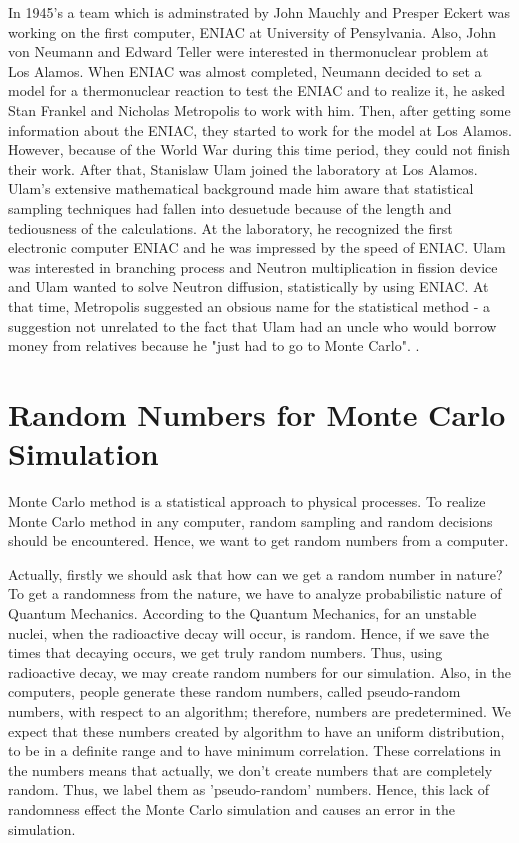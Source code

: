 \documentclass[12pt,fleqn]{report}
\begin{document}
In 1945's a team which is adminstrated by John Mauchly and Presper Eckert was working on the first computer, ENIAC at University of Pensylvania. Also, John von Neumann and Edward Teller were interested in thermonuclear problem at Los Alamos. When ENIAC was almost completed, Neumann decided to set a model for a thermonuclear reaction to test the ENIAC and to realize it, he asked Stan Frankel and Nicholas Metropolis to work with him. Then, after getting some information about the ENIAC, they started to work for the model at Los Alamos. However, because of the World War during this time period, they could not finish their work. After that, Stanislaw Ulam joined the laboratory at Los Alamos. 
Ulam's extensive mathematical background made him aware that statistical sampling techniques had fallen into desuetude because of the length and tediousness of the calculations.\cite{mc}  At the laboratory, he recognized the first electronic computer ENIAC and he was impressed by the speed of ENIAC. Ulam was interested in branching process and Neutron multiplication in fission device and Ulam wanted to solve Neutron diffusion, statistically by using ENIAC. At that time, Metropolis suggested an obsious name for the statistical method - a suggestion not unrelated to the fact that Ulam had an uncle who would borrow money from relatives because he "just had to go to Monte Carlo". \cite{mc}.

\section{Random Numbers for Monte Carlo Simulation}


Monte Carlo method is a statistical approach to physical processes. To realize Monte Carlo method in any computer, random sampling and random decisions should be encountered. Hence, we want to get random numbers from a computer.

Actually, firstly we should ask that how can we get a random number in nature?  To get a randomness from the nature, we have to analyze probabilistic nature of Quantum Mechanics. According to the Quantum Mechanics, for an unstable nuclei, when the radioactive decay will occur, is random. Hence, if we save the times that decaying occurs, we get truly random numbers. Thus, using radioactive decay, we may create random numbers for our simulation. Also, in the computers, people generate these random numbers, called pseudo-random numbers, with respect to an algorithm; therefore, numbers are predetermined. We expect that these numbers created by algorithm to have an uniform distribution, to be in a definite range and to have minimum correlation. These correlations in the numbers means that actually, we don't create numbers that are completely random. Thus, we label them as 'pseudo-random' numbers. Hence, this lack of randomness effect the Monte Carlo simulation and causes an error in the simulation. 
 
\end{document}

